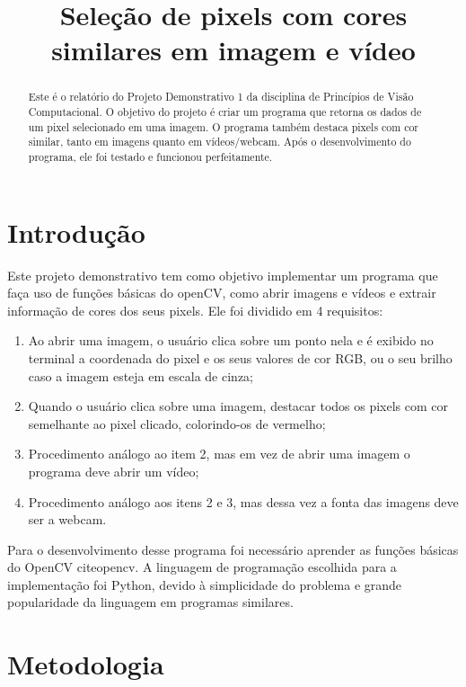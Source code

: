 \documentclass{bmvc2k}
\title{Seleção de pixels com cores \\similares em imagem e vídeo}
\begin{document}

\maketitle

\begin{abstract}
Este é o relatório do Projeto Demonstrativo 1 da disciplina de Princípios de Visão Computacional. O objetivo do projeto é criar um programa que retorna os dados de um pixel selecionado em uma imagem. O programa também destaca pixels com cor similar, tanto em imagens quanto em vídeos/webcam. Após o desenvolvimento do programa, ele foi testado e funcionou perfeitamente.
\end{abstract}


\section{Introdução}
\label{sec:intro}

Este projeto demonstrativo tem como objetivo implementar um programa que faça uso de funções básicas do openCV, como abrir imagens e vídeos e extrair informação de cores dos seus pixels. Ele foi dividido em 4 requisitos:
\begin{enumerate}
    \item Ao abrir uma imagem, o usuário clica sobre um ponto nela e é exibido no terminal a coordenada do pixel e os seus valores de cor RGB, ou o seu brilho caso a imagem esteja em escala de cinza;
    \item Quando o usuário clica sobre uma imagem, destacar todos os pixels com cor semelhante ao pixel clicado, colorindo-os de vermelho;
    \item Procedimento análogo ao item 2, mas em vez de abrir uma imagem o programa deve abrir um vídeo;
    \item Procedimento análogo aos itens 2 e 3, mas dessa vez a fonta das imagens deve ser a webcam.
\end{enumerate}

Para o desenvolvimento desse programa foi necessário aprender as funções básicas do OpenCV cite{opencv}. A linguagem de programação escolhida para a implementação foi Python, devido à simplicidade do problema e grande popularidade da linguagem em programas similares.

\section{Metodologia}
\label{sec:met}
\end{document}
